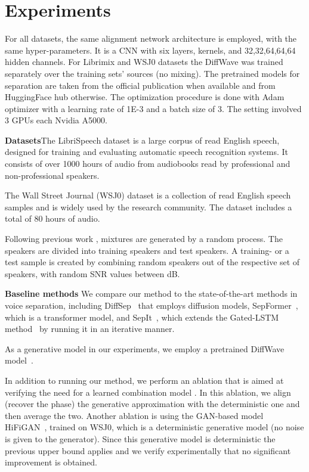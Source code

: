 \documentclass{article}
\theoremstyle{plain}
\theoremstyle{definition}
\theoremstyle{remark}
\begin{document}
\section{Experiments}
\label{sec:experiments}


For all datasets, the same alignment network architecture is employed, with the same hyper-parameters. It is a CNN with six layers,  kernels, and 32,32,64,64,64 hidden channels. For Librimix and WSJ0 datasets the DiffWave was trained separately over the training sets' sources (no mixing). The pretrained models for separation are taken from the official publication when available and from HuggingFace hub otherwise. The optimization procedure is done with Adam \cite{kingma2014adam} optimizer with a learning rate of 1E-3 and a batch size of 3. The setting involved 3 GPUs each Nvidia A5000.

\smallskip
{\bf Datasets\quad}The LibriSpeech dataset \cite{panayotov2015librispeech} is a large corpus of read English speech, designed for training and evaluating automatic speech recognition systems. It consists of over 1000 hours of audio from audiobooks read by professional and non-professional speakers.

The Wall Street Journal (WSJ0) \cite{wsj0} dataset is a collection of read English speech samples and is widely used by the research community. The dataset includes a total of 80 hours of audio.

 Following previous work \cite{subakan2021attention,dovrat2021many}, mixtures are generated by a random process. The speakers are divided into training speakers and test speakers. A training- or a test sample is created by combining random speakers out of the respective set of speakers, with random SNR values between  dB. 

\smallskip
{\bf Baseline methods\quad} We compare our method to the state-of-the-art methods in voice separation, including DiffSep~\cite{scheibler2022diffusion} that employs diffusion models, SepFormer~\cite{subakan2021attention}, which is a transformer model, and SepIt~\cite{sepit}, which extends the Gated-LSTM method~\cite{pmlr-v119-nachmani20a} by running it in an iterative manner.

As a generative model in our experiments, we employ a pretrained DiffWave model~\cite{kong2020diffwave}. 

In addition to running our method, we perform an ablation that is aimed at verifying the need for a learned combination model . In this ablation, we align (recover the phase) the generative approximation with the deterministic one and then average the two. Another ablation is using the GAN-based model HiFiGAN~\cite{kong2020hifi}, trained on WSJ0, which is a deterministic generative model (no noise is given to the generator). Since this generative model is deterministic the previous upper bound applies and we verify experimentally that no significant improvement is obtained. 
\end{document}

